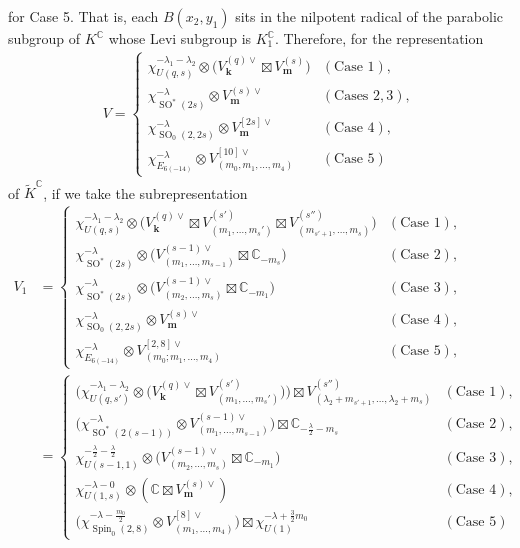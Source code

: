 \documentclass[pdftex]{sigma}
\numberwithin{equation}{section}
\newcommand{\bk}{\mathbf{k}}
\newcommand{\bm}{\mathbf{m}}
\newcommand{\BC}{\mathbb{C}}
\begin{document}
for Case 5. That is, each $B(x_2,y_1)$ sits in the nilpotent radical of the parabolic subgroup of $K^\BC$ whose Levi subgroup is $K^\BC_1$.
Therefore, for the representation
\begin{gather*} V=\begin{cases} \chi^{-\lambda_1-\lambda_2}_{U(q,s)}\otimes \big(V_\bk^{(q)\vee}\boxtimes V_\bm^{(s)}\big) & (\text{Case }1),\\
\chi^{-\lambda}_{\operatorname{SO}^*(2s)}\otimes V_\bm^{(s)\vee} & (\text{Cases }2,3),\\
\chi^{-\lambda}_{\operatorname{SO}_0(2,2s)}\otimes V_\bm^{[2s]\vee} & (\text{Case 4}),\\
\chi^{-\lambda}_{E_{6(-14)}}\otimes V_{(m_0,m_1,\ldots,m_4)}^{[10]\vee} & (\text{Case 5})\end{cases} \end{gather*}
of $\tilde{K}^\BC$, if we take the subrepresentation
\begin{align*}
V_1&=\begin{cases} \chi^{-\lambda_1-\lambda_2}_{U(q,s)}\otimes \big(V_\bk^{(q)\vee}\boxtimes V_{(m_1,\ldots,m_s')}^{(s')}
\boxtimes V_{(m_{s'+1},\ldots,m_{s})}^{(s'')}\big) & (\text{Case }1),\\
\chi^{-\lambda}_{\operatorname{SO}^*(2s)}\otimes \big(V_{(m_1,\ldots,m_{s-1})}^{(s-1)\vee}\boxtimes \BC_{-m_s}\big) & (\text{Case }2),\\
\chi^{-\lambda}_{\operatorname{SO}^*(2s)}\otimes \big(V_{(m_2,\ldots,m_s)}^{(s-1)\vee}\boxtimes \BC_{-m_1}\big) & (\text{Case }3),\\
\chi^{-\lambda}_{\operatorname{SO}_0(2,2s)}\otimes V_\bm^{(s)\vee} & (\text{Case }4),\\
\chi^{-\lambda}_{E_{6(-14)}}\otimes V_{(m_0;m_1,\ldots,m_4)}^{[2,8]\vee} & (\text{Case }5),\end{cases} \\
&=\begin{cases} \big(\chi^{-\lambda_1-\lambda_2}_{U(q,s')}\otimes \big(V_\bk^{(q)\vee}\boxtimes V_{(m_1,\ldots,m_s')}^{(s')}\big)\big)
\boxtimes V_{(\lambda_2+m_{s'+1},\ldots,\lambda_2+m_{s})}^{(s'')} & (\text{Case }1),\\
\big(\chi^{-\lambda}_{\operatorname{SO}^*(2(s-1))}\otimes V_{(m_1,\ldots,m_{s-1})}^{(s-1)\vee}\big)\boxtimes \BC_{-\frac{\lambda}{2}-m_s} & (\text{Case }2),\\
\chi^{-\frac{\lambda}{2}-\frac{\lambda}{2}}_{U(s-1,1)}\otimes \big(V_{(m_2,\ldots,m_s)}^{(s-1)\vee}\boxtimes \BC_{-m_1}\big) & (\text{Case }3),\\
\chi^{-\lambda-0}_{U(1,s)}\otimes (\BC\boxtimes V_\bm^{(s)\vee}) & (\text{Case }4),\\
\big(\chi^{-\lambda-\frac{m_0}{2}}_{\operatorname{Spin}_0(2,8)}\otimes V_{(m_1,\ldots,m_4)}^{[8]\vee}\big)
\boxtimes \chi^{-\lambda+\frac{3}{2}m_0}_{U(1)} & (\text{Case }5)\end{cases}\end{align*}
\end{document}
